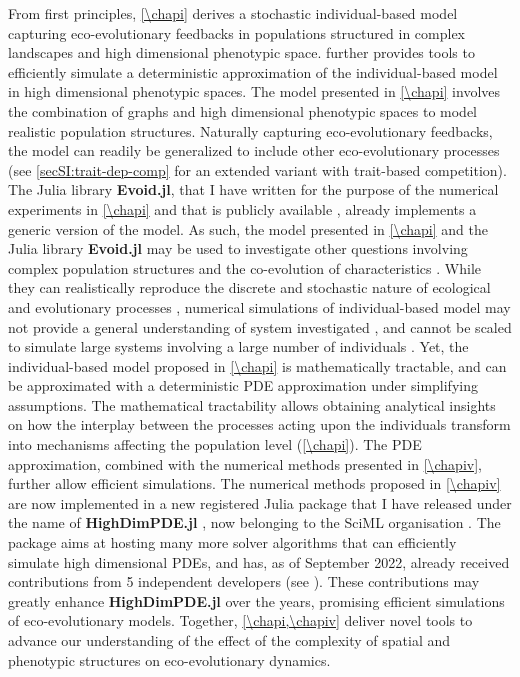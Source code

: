 From first principles, \cref{\chapi} derives a stochastic individual-based model capturing eco-evolutionary feedbacks in populations structured in complex landscapes and high dimensional phenotypic space. \Cref{\chapiv} further provides tools to efficiently simulate a deterministic approximation of the individual-based model in high dimensional phenotypic spaces.
% 
The model presented in \cref{\chapi} involves the combination of graphs and high dimensional phenotypic spaces to model realistic population structures. Naturally capturing eco-evolutionary feedbacks, the model can readily be generalized to include other eco-evolutionary processes (see \cref{secSI:trait-dep-comp} for an extended variant with trait-based competition). The Julia library \textbf{Evoid.jl}, that I have written for the purpose of the numerical experiments in \cref{\chapi} and that is publicly available \citep{Evoid}, already implements a generic version of the model. %
% 
As such, the model presented in \cref{\chapi} and the Julia library \textbf{Evoid.jl} may be used to investigate other questions involving complex population structures \citep{LiebermanHauert2005} and the co-evolution of characteristics \citep{Doebeli2011}.
% 
While they can realistically reproduce the discrete and stochastic nature of ecological and evolutionary processes \citep{deangelis2005individual}, numerical simulations of individual-based model may not provide a general understanding of system investigated \citep{Lion2016,Hodgson2019}, and cannot be scaled to simulate large systems involving a large number of individuals \citep{deangelis2005individual}. Yet, the individual-based model proposed in \cref{\chapi} is mathematically tractable, and can be approximated with a deterministic PDE approximation under simplifying assumptions.
% 
The mathematical tractability allows obtaining analytical insights on how the interplay between the processes acting upon the individuals transform into mechanisms affecting the population level (\cref{\chapi}).
% 
The PDE approximation, combined with the numerical methods presented in \cref{\chapiv}, further allow efficient simulations. 
% 
The numerical methods proposed in \cref{\chapiv} are now implemented in a new registered Julia package that I have released under the name of \textbf{HighDimPDE.jl} \citep{HighDimPDE}, now belonging to the SciML organisation \citep{Rackauckas2020a}.
%
The package aims at hosting many more solver algorithms that can efficiently simulate high dimensional PDEs, and has, as of September 2022, already received contributions from 5 independent developers (see \cite{contribHighDimPDE}). These contributions may greatly enhance \textbf{HighDimPDE.jl} over the years, promising efficient simulations of eco-evolutionary models.
% 
Together, \cref{\chapi,\chapiv} deliver novel tools to advance our understanding of the effect of the complexity of spatial and phenotypic structures on eco-evolutionary dynamics.


